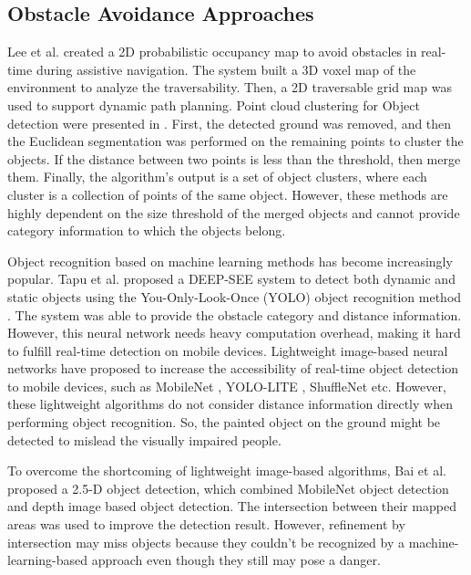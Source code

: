 \documentclass{ieeeaccess}
\begin{document}
\subsection{Obstacle Avoidance Approaches}
Lee et al. \cite{IEEEexample:lee2014wearable} created a 2D probabilistic occupancy map to avoid obstacles in real-time during assistive navigation. The system built a 3D voxel map of the environment to analyze the traversability. Then, a 2D traversable grid map was used to support dynamic path planning. Point cloud clustering for Object detection were presented in \cite{IEEEexample:wang2017enabling} \cite{IEEEexample:vision_based_mobile_indoor_nav_BingLi_2019}. First, the detected ground was removed, and then the Euclidean segmentation was performed on the remaining points to cluster the objects. If the distance between two points is less than the threshold, then merge them. Finally, the algorithm's output is a set of object clusters, where each cluster is a collection of points of the same object. However, these methods are highly dependent on the size threshold of the merged objects and cannot provide category information to which the objects belong.



Object recognition based on machine learning methods has become increasingly popular. Tapu et al. \cite{IEEEexample:tapu2017deep} proposed a DEEP-SEE system to detect both dynamic and static objects using the You-Only-Look-Once (YOLO) object recognition method \cite{IEEEexample:redmon2016you}. The system was able to provide the obstacle category and distance information. However, this neural network needs heavy computation overhead, making it hard to fulfill real-time detection on mobile devices. Lightweight image-based neural networks have proposed to increase the accessibility of real-time object detection to mobile devices, such as MobileNet \cite{IEEEexample:howard2017mobilenets}, YOLO-LITE \cite{IEEEexample:DBLP:journals/corr/abs-1811-05588}, ShuffleNet \cite{IEEEexample:zhang2018shufflenet} etc. However, these lightweight algorithms do not consider distance information directly when performing object recognition. So, the painted object on the ground might be detected to mislead the visually impaired people.

To overcome the shortcoming of lightweight image-based algorithms, Bai et al. \cite{IEEEexample:bai2019wearable} proposed a 2.5-D object detection, which combined MobileNet object detection and depth image based object detection. The intersection between their mapped areas was used to improve the detection result. However, refinement by intersection may miss objects because they couldn't be recognized by a machine-learning-based approach even though they still may pose a danger. 
\end{document}
